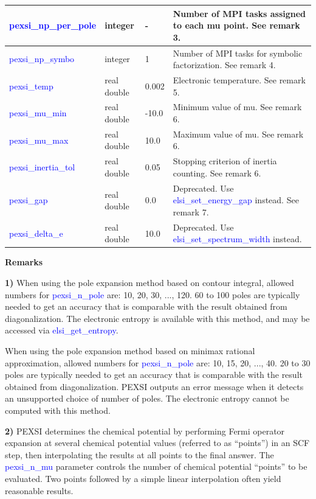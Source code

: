 \documentclass{report}
\newcommand{\tcb}[1]{\textcolor{blue}{#1}}
\begin{document}
\begin{tabular}[]{|p{30mm}|p{20mm}|p{15mm}|p{100mm}|}
\hline
\tcb{pexsi\_np\_per\_pole} & integer     & -     & Number of MPI tasks assigned to each mu point. See remark 3.\\
\hline
\tcb{pexsi\_np\_symbo}     & integer     & 1     & Number of MPI tasks for symbolic factorization. See remark 4.\\
\hline
\tcb{pexsi\_temp}          & real double & 0.002 & Electronic temperature. See remark 5.\\
\hline
\tcb{pexsi\_mu\_min}       & real double & -10.0 & Minimum value of mu. See remark 6.\\
\hline
\tcb{pexsi\_mu\_max}       & real double & 10.0  & Maximum value of mu. See remark 6.\\
\hline
\tcb{pexsi\_inertia\_tol}  & real double & 0.05  & Stopping criterion of inertia counting. See remark 6.\\
\hline
\tcb{pexsi\_gap}           & real double & 0.0   & Deprecated. Use \tcb{elsi\_set\_energy\_gap} instead. See remark 7.\\
\hline
\tcb{pexsi\_delta\_e}      & real double & 10.0  & Deprecated. Use \tcb{elsi\_set\_spectrum\_width} instead.\\
\hline
\end{tabular}

\textbf{Remarks}

\textbf{1)} When using the pole expansion method based on contour integral, allowed numbers for \tcb{pexsi\_n\_pole} are: 10, 20, 30, ..., 120. 60 to 100 poles are typically needed to get an accuracy that is comparable with the result obtained from diagonalization. The electronic entropy is available with this method, and may be accessed via \tcb{elsi\_get\_entropy}.

When using the pole expansion method based on minimax rational approximation, allowed numbers for \tcb{pexsi\_n\_pole} are: 10, 15, 20, ..., 40. 20 to 30 poles are typically needed to get an accuracy that is comparable with the result obtained from diagonalization. PEXSI outputs an error message when it detects an unsupported choice of number of poles. The electronic entropy cannot be computed with this method.

\textbf{2)} PEXSI determines the chemical potential by performing Fermi operator expansion at several chemical potential values (referred to as ``points'') in an SCF step, then interpolating the results at all points to the final answer. The \tcb{pexsi\_n\_mu} parameter controls the number of chemical potential ``points'' to be evaluated. Two points followed by a simple linear interpolation often yield reasonable results.
\end{document}
